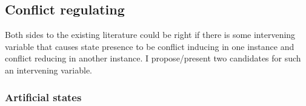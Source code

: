 \documentclass[12pt]{article}
\begin{document}
\begin{multicols}{2}
\subsection{Conflict regulating}


Both sides to the existing literature could be right if there is some
intervening variable that causes state presence to be conflict inducing in one
instance and conflict reducing in another instance. I propose/present two
candidates for such an intervening variable.

\subsubsection{Artificial states}


\end{multicols}
\end{document}
